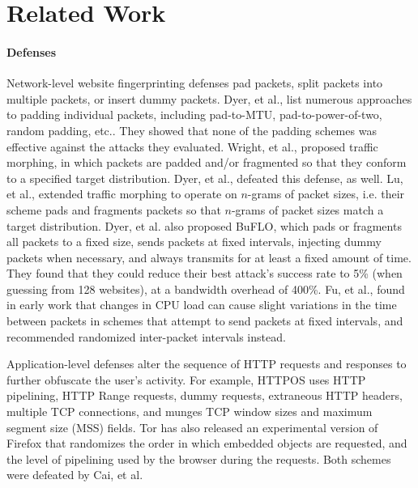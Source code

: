 \documentclass[10pt,journal]{IEEEtran}
\newcommand{\buflo} {BuFLO\xspace}
\begin{document}
\section{Related Work}
\label{sec:related-work}

\paragraph*{Defenses} Network-level website fingerprinting defenses
pad packets, split packets into multiple packets, or insert dummy
packets.  Dyer, et al., list numerous approaches to padding individual
packets, including pad-to-MTU, pad-to-power-of-two, random padding,
etc.\cite{dyer-snp12}.  They showed that none of the padding schemes
was effective against the attacks they evaluated.  Wright, et al.,
proposed traffic morphing, in which packets are padded and/or
fragmented so that they conform to a specified target
distribution\cite{wright-ndss09}.  Dyer, et al., defeated this
defense, as well\cite{dyer-snp12}.  Lu, et al., extended traffic
morphing to operate on $n$-grams of packet sizes, i.e. their scheme
pads and fragments packets so that $n$-grams of packet sizes match a
target distribution\cite{lu-esorics10}.  Dyer, et al. also proposed
\buflo, which pads or fragments all packets to a fixed size, sends
packets at fixed intervals, injecting dummy packets when necessary,
and always transmits for at least a fixed amount of
time\cite{dyer-snp12}.  They found that they could reduce their best
attack's success rate to 5\% (when guessing from 128 websites), at a
bandwidth overhead of 400\%.  Fu, et al., found in early work
that changes in CPU load can cause slight variations in the time
between packets in schemes that attempt to send packets at fixed
intervals, and recommended randomized inter-packet intervals
instead\cite{fu-iaw03}.

Application-level defenses alter the sequence of HTTP requests and
responses to further obfuscate the user's activity.  For example,
HTTPOS uses HTTP pipelining, HTTP Range requests, dummy requests,
extraneous HTTP headers, multiple TCP connections, and munges TCP
window sizes and maximum segment size (MSS) fields\cite{luo-ndss11}.
Tor has also released an experimental version of Firefox that
randomizes the order in which embedded objects are requested, and the
level of pipelining used by the browser during the
requests\cite{tor-randomized-pipelining}.  Both schemes were defeated
by Cai, et al\cite{cai-ccs12}.
\end{document}
